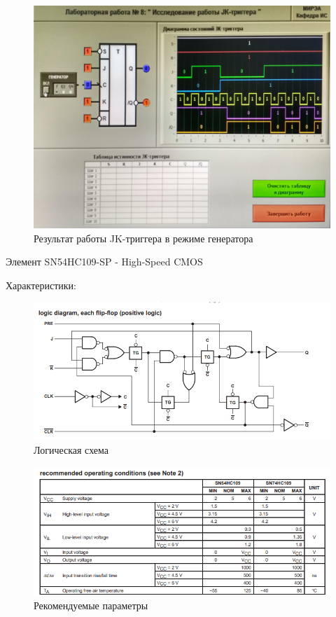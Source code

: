 \begin{figure}[H]
	\centering
	\includegraphics[width=0.95\linewidth]{imgs/8/2}
	\caption{Результат работы JK-триггера в режиме генератора}
	\label{fig:8_2}
\end{figure}

Элемент SN54HC109-SP - High-Speed CMOS

Характеристики:

\begin{figure}[H]
	\centering
	\includegraphics[width=0.95\linewidth]{imgs/8/ti1}
	\caption{Логическая схема}
	\label{fig:8_ti1}
\end{figure}

\begin{figure}[H]
	\centering
	\includegraphics[width=0.95\linewidth]{imgs/8/ti2}
	\caption{Рекомендуемые параметры}
	\label{fig:8_ti2}
\end{figure}

